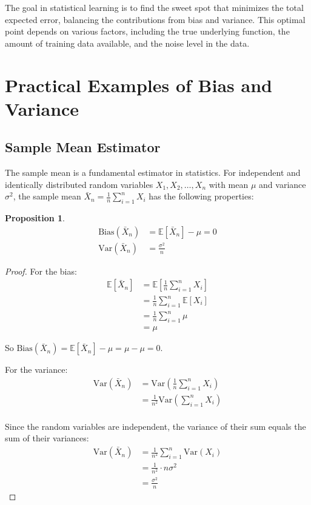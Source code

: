 \documentclass{article}
\newtheorem{proposition}[theorem]{Proposition}
\begin{document}
The goal in statistical learning is to find the sweet spot that minimizes the total expected error, balancing the contributions from bias and variance. This optimal point depends on various factors, including the true underlying function, the amount of training data available, and the noise level in the data.

\section{Practical Examples of Bias and Variance}

\subsection{Sample Mean Estimator}

The sample mean is a fundamental estimator in statistics. For independent and identically distributed random variables $X_1, X_2, \ldots, X_n$ with mean $\mu$ and variance $\sigma^2$, the sample mean $\bar{X}_n = \frac{1}{n} \sum_{i=1}^n X_i$ has the following properties:

\begin{proposition}
\begin{align*}
\text{Bias}(\bar{X}_n) &= \mathbb{E}[\bar{X}_n] - \mu = 0 \\
\text{Var}(\bar{X}_n) &= \frac{\sigma^2}{n}
\end{align*}
\end{proposition}

\begin{proof}
For the bias:
\begin{align*}
\mathbb{E}[\bar{X}_n] &= \mathbb{E}\left[\frac{1}{n} \sum_{i=1}^n X_i\right] \\
&= \frac{1}{n} \sum_{i=1}^n \mathbb{E}[X_i] \\
&= \frac{1}{n} \sum_{i=1}^n \mu \\
&= \mu
\end{align*}

So $\text{Bias}(\bar{X}_n) = \mathbb{E}[\bar{X}_n] - \mu = \mu - \mu = 0$.

For the variance:
\begin{align*}
\text{Var}(\bar{X}_n) &= \text{Var}\left(\frac{1}{n} \sum_{i=1}^n X_i\right) \\
&= \frac{1}{n^2} \text{Var}\left(\sum_{i=1}^n X_i\right) \\
\end{align*}

Since the random variables are independent, the variance of their sum equals the sum of their variances:
\begin{align*}
\text{Var}(\bar{X}_n) &= \frac{1}{n^2} \sum_{i=1}^n \text{Var}(X_i) \\
&= \frac{1}{n^2} \cdot n\sigma^2 \\
&= \frac{\sigma^2}{n}
\end{align*}
\end{proof}
\end{document}
